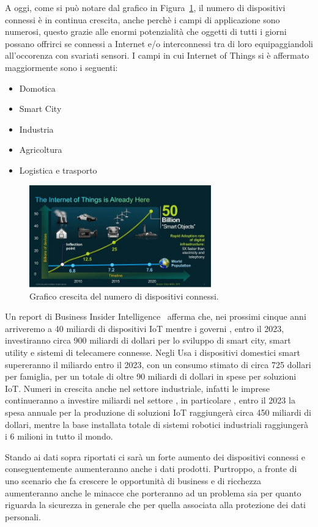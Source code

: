 A oggi, come si può notare dal grafico in Figura~\ref{IOTgraph}, il numero di dispositivi connessi è in continua crescita, anche perchè i campi di applicazione sono numerosi, 
questo grazie alle enormi potenzialità che oggetti di tutti i giorni possano offrirci se connessi a Internet e/o interconnessi tra di loro equipaggiandoli 
all'occorenza con svariati sensori.
I campi in cui Internet of Things si è affermato maggiormente sono i seguenti:
\begin{itemize}
    \item Domotica
    \item Smart City
    \item Industria
    \item Agricoltura
    \item Logistica e trasporto
\end{itemize}
\begin{figure}[htb]
    \centering
    \includegraphics[width=0.7\textwidth]{images/IoT-graph.png}
    \caption{Grafico crescita del numero di dispositivi connessi.}
    \label{IOTgraph}
\end{figure}
Un report di Business Insider Intelligence~\cite{insiderIntelligence} afferma che, nei prossimi cinque anni arriveremo a 40 miliardi di dispositivi IoT mentre
i governi , entro il 2023, investiranno circa 900 miliardi di dollari per lo sviluppo di smart city, smart utility e sistemi di telecamere connesse. 
Negli Usa i dispositivi domestici smart supereranno il miliardo entro il 2023, con un consumo stimato di circa 725 dollari per famiglia, per un totale di oltre 
90 miliardi di dollari in spese per soluzioni IoT. Numeri in crescita anche nel settore industriale, infatti le imprese continueranno a investire miliardi nel settore , 
in particolare , entro il 2023 la spesa annuale per la produzione di soluzioni IoT raggiungerà circa 450 miliardi di dollari, mentre la base installata totale di sistemi 
robotici industriali raggiungerà i 6 milioni in tutto il mondo.

Stando ai dati sopra riportati ci sarà un forte aumento dei dispositivi connessi e conseguentemente aumenteranno anche i dati prodotti. Purtroppo, a fronte di uno 
scenario che fa crescere le opportunità di business e di ricchezza aumenteranno anche le minacce che porteranno ad un problema sia per quanto riguarda la sicurezza 
in generale che per quella associata alla protezione dei dati personali.

